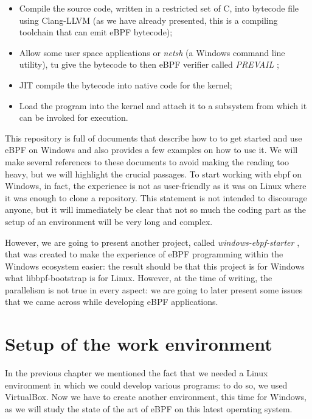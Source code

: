 \begin{itemize}
	\item 
		Compile the source code, written in a restricted set of C, into bytecode file using Clang-LLVM (as we have already presented, this is a compiling toolchain that can emit eBPF bytecode);
	\item 
		Allow some user space applications or \textit{netsh} (a Windows command line utility), tu give the bytecode to then eBPF verifier called \textit{PREVAIL} \cite{PrevailVerifier};
	\item 
		JIT compile the bytecode into native code for the kernel;
	\item 
		Load the program into the kernel and attach it to a subsystem from which it can be invoked for execution.
\end{itemize}

This repository is full of documents that describe how to to get started and use eBPF on Windows and also provides a few examples on how to use it.
We will make several references to these documents to avoid making the reading too heavy, but we will highlight the crucial passages.
To start working with ebpf on Windows, in fact, the experience is not as user-friendly as it was on Linux where it was enough to clone a repository.
This statement is not intended to discourage anyone, but it will immediately be clear that not so much the coding part as the setup of an environment will be very long and complex.

However, we are going to present another project, called \textit{windows-ebpf-starter} \cite{WineBPFStarterRepo}, that was created to make the experience of eBPF programming within the Windows ecosystem easier: the result should be that this project is for Windows what libbpf-bootstrap is for Linux.
However, at the time of writing, the parallelism is not true in every aspect: we are going to later present some issues that we came across while developing eBPF applications.

\section{Setup of the work environment}

In the previous chapter we mentioned the fact that we needed a Linux environment in which we could develop various programs: to do so, we used VirtualBox.
Now we have to create another environment, this time for Windows, as we will study the state of the art of eBPF on this latest operating system. 

